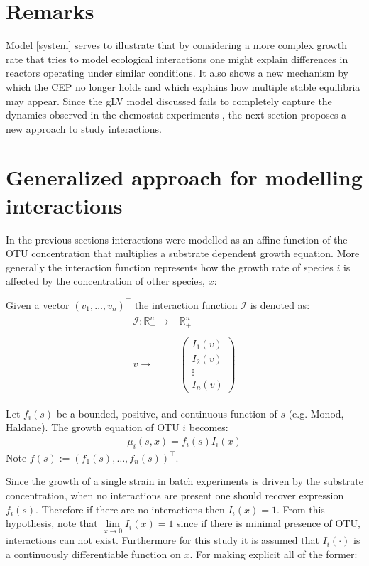 \documentclass[3p,times]{article}
\newcommand{\R}{\mathbb{R}}
\newcommand{\I}{\mathcal{I}}
\begin{document}
\section*{Remarks}

Model \eqref{system} serves to illustrate that by considering a more complex growth rate that tries to model ecological interactions one might explain differences in reactors operating under similar conditions. It also shows a new mechanism by which the CEP no longer holds and which explains how multiple stable equilibria may appear. Since the gLV model discussed fails to completely capture the dynamics observed in the chemostat experiments \cite{Dumont2016}, the next section proposes a new approach to study interactions.


\section{Generalized approach for modelling interactions}
In the previous sections interactions were modelled as an affine function of the OTU concentration that multiplies a substrate dependent growth equation. More generally the interaction function represents how the growth rate of species $i$ is affected by the concentration of other species, $x$: 

Given a vector $(v_1,\dots,v_n)^\top$ the interaction function $\I$ is denoted as:
\begin{align}
\begin{array}{rc}
\I: \R_+^n \rightarrow & \R_+^n\\
& \\
v \rightarrow & \begin{pmatrix}
I_1(v) \\
I_2(v) \\ 
\vdots  \\
I_n(v)
\end{pmatrix}
\end{array}
\end{align}

Let $f_i(s)$ be a bounded, positive, and continuous function of $s$ (e.g. Monod, Haldane). The growth equation of OTU $i$ becomes:
\begin{align}
	\mu_i(s,x) = f_i(s)I_i(x)
\end{align}
Note $f(s) := (f_1(s),\dots,f_n(s))^\top$.
	\label{growthForm}

Since the growth of a single strain in batch experiments is driven by the substrate concentration, when no interactions are present one should recover expression $f_i(s)$. Therefore if there are no interactions then $I_i(x) = 1$. From this hypothesis, note that $ \lim \limits_{x \rightarrow 0} I_i(x) = 1$ since if there is minimal presence of OTU, interactions can not exist. Furthermore for this study it is assumed that $I_i(\cdot)$ is a continuously differentiable function on $x$. For making explicit all of the former:
\end{document}
